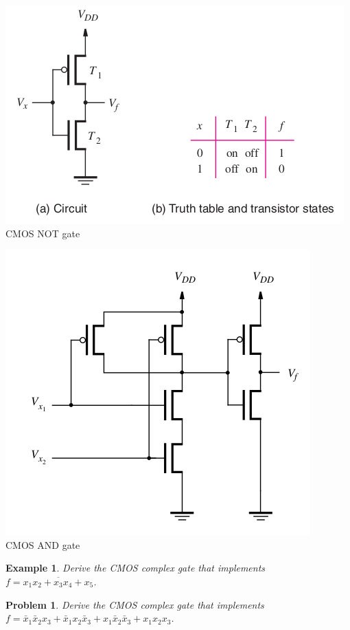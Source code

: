 \documentclass{article}
\newtheorem{prob}{Problem}
\newtheorem{example}{Example}
\newcommand{\bx}{\bar{x}}
\begin{document}
\begin{minipage}{0.45\linewidth}
\includegraphics[width=\linewidth]{./fig/cmos-not.png} \\
CMOS NOT gate
\end{minipage}
\begin{minipage}{0.45\linewidth}
\includegraphics[width=\linewidth]{./fig/cmos-and.png} \\
CMOS AND gate
\end{minipage}


\begin{example}
  Derive the  CMOS complex gate that implements
  $f = \overline{x_1 x_2 + x_3 x_4 + x_5}$.
\end{example}

\begin{prob}
  Derive the  CMOS complex gate that implements
  $f = \bx_1 \bx_2 x_3 + \bx_1 x_2 \bx_3 + x_1 \bx_2 \bx_3 + x_1 x_2 x_3$.
\end{prob}
\end{document}
